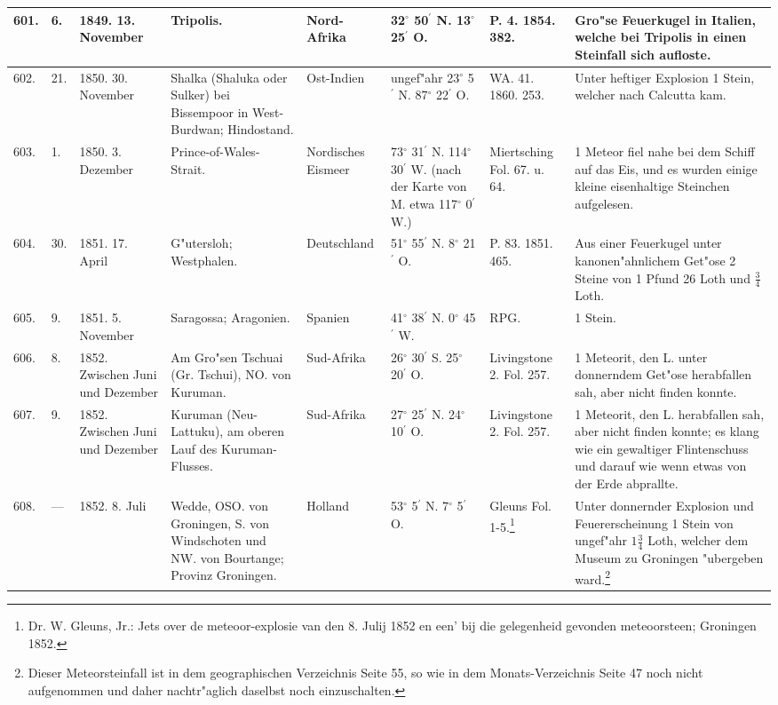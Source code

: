 \documentclass[a4paper, 8pt, oneside, polutonikogreek, german]{article}
\begin{document}
\begin{center}
\begin{longtable}{| p{5mm} | p{3mm} | p{15mm} | p{25mm} | p{20mm} | p{14mm} | p{17mm} | p{24mm} |}
        601. & 6. & 1849. 13. November & Tripolis. & Nord-Afrika & 32$^\circ$ 50$^\prime$ N. 13$^\circ$ 25$^\prime$ O. & P. 4. 1854. 382. & Gro"se Feuerkugel in Italien, welche bei Tripolis in einen Steinfall sich aufloste. \\ \hline
        602. & 21. & 1850. 30. November & Shalka (Shaluka oder Sulker) bei Bissempoor in West-Burdwan; Hindostand. & Ost-Indien & ungef"ahr 23$^\circ$ 5$^\prime$ N. 87$^\circ$ 22$^\prime$ O. & WA. 41. 1860. 253. & Unter heftiger Explosion 1 Stein, welcher nach Calcutta kam. \\ \hline
        603. & 1. & 1850. 3. Dezember & Prince-of-Wales-Strait. & Nordisches Eismeer & 73$^\circ$ 31$^\prime$ N. 114$^\circ$ 30$^\prime$ W. (nach der Karte von M. etwa 117$^\circ$ 0$^\prime$ W.) & Miertsching Fol. 67. u. 64. & 1 Meteor fiel nahe bei dem Schiff auf das Eis, und es wurden einige kleine eisenhaltige Steinchen aufgelesen. \\ \hline
        604. & 30. & 1851. 17. April & G"utersloh; Westphalen. & Deutschland & 51$^\circ$ 55$^\prime$ N. 8$^\circ$ 21$^\prime$ O. & P. 83. 1851. 465. & Aus einer Feuerkugel unter kanonen"ahnlichem Get"ose 2 Steine von 1 Pfund 26 Loth und $\frac{3}{4}$ Loth. \\ \hline
        605. & 9. & 1851. 5. November & Saragossa; Aragonien. & Spanien & 41$^\circ$ 38$^\prime$ N. 0$^\circ$ 45$^\prime$ W. & RPG. & 1 Stein. \\ \hline
        606. & 8. & 1852. Zwischen Juni und Dezember & Am Gro"sen Tschuai (Gr. Tschui), NO. von Kuruman. & Sud-Afrika & 26$^\circ$ 30$^\prime$ S. 25$^\circ$ 20$^\prime$ O. & Livingstone 2. Fol. 257. & 1 Meteorit, den L. unter donnerndem Get"ose herabfallen sah, aber nicht finden konnte. \\ \hline
        607. & 9. & 1852. Zwischen Juni und Dezember & Kuruman (Neu-Lattuku), am oberen Lauf des Kuruman-Flusses. & Sud-Afrika & 27$^\circ$ 25$^\prime$ N. 24$^\circ$ 10$^\prime$ O. & Livingstone 2. Fol. 257. & 1 Meteorit, den L. herabfallen sah, aber nicht finden konnte; es klang wie ein gewaltiger Flintenschuss und darauf wie wenn etwas von der Erde abprallte. \\ \hline
        608. & --- & 1852. 8. Juli & Wedde, OSO. von Groningen, S. von Windschoten und NW. von Bourtange; Provinz Groningen. & Holland & 53$^\circ$ 5$^\prime$ N. 7$^\circ$ 5$^\prime$ O. & Gleuns Fol. 1-5.\footnote{Dr. W. Gleuns, Jr.: Jets over de meteoor-explosie van den 8. Julij 1852 en een' bij die gelegenheid gevonden meteoorsteen; Groningen 1852.} & Unter donnernder Explosion und Feuererscheinung 1 Stein von ungef"ahr $1\frac{3}{4}$ Loth, welcher dem Museum zu Groningen "ubergeben ward.\footnote{Dieser Meteorsteinfall ist in dem geographischen Verzeichnis Seite 55, so wie in dem Monats-Verzeichnis Seite 47 noch nicht aufgenommen und daher nachtr"aglich daselbst noch einzuschalten.} \\ \hline

\end{longtable}
\end{center}
\end{document}
